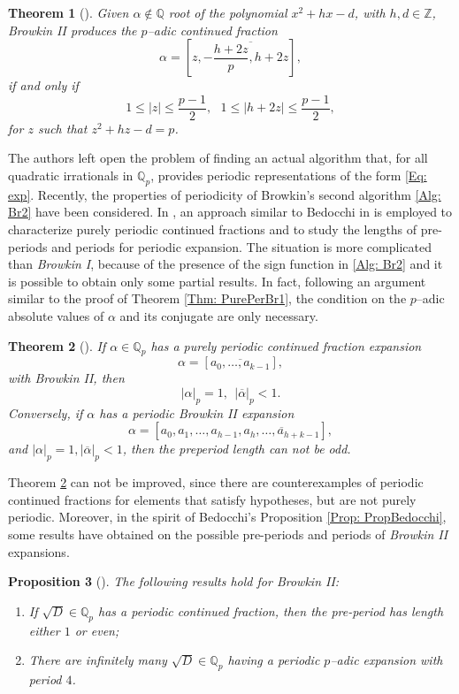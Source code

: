 \documentclass[12pt, reqno]{amsart}
\theoremstyle{plain}
\newtheorem{Theorem}{Theorem}
\newtheorem{Proposition}[Theorem]{Proposition}
\theoremstyle{definition}
\begin{document}
\begin{Theorem}[\cite{BCMI}]
Given $\alpha\not\in\mathbb{Q}$ root of the polynomial $x^2+hx-d$, with $h,d\in\mathbb{Z}$, \textit{Browkin II} produces the $p$--adic continued fraction
\begin{equation}
\alpha=\left[z,-\overline{\frac{h+2z}{p},h+2z}  \right],
\end{equation}
if and only if
\[1\leq|z|\leq\frac{p-1}{2}, \ \ \ 1\leq|h+2z|\leq\frac{p-1}{2},\]
for $z$ such that $z^2+hz-d=p$.
\end{Theorem}

The authors left open the problem of finding an actual algorithm that, for all quadratic irrationals in $\mathbb{Q}_p$, provides periodic representations of the form \eqref{Eq: exp}. Recently, the properties of periodicity of Browkin's second algorithm \eqref{Alg: Br2} have been considered. In \cite{MRSI}, an approach similar to Bedocchi in \cite{BEI,BEII,BEIII,BEIV} is employed to characterize purely periodic continued fractions and to study the lengths of pre-periods and periods for periodic expansion. The situation is more complicated than \textit{Browkin I}, because of the presence of the sign function in \eqref{Alg: Br2} and it is possible to obtain only some partial results. In fact, following an argument similar to the proof of Theorem \ref{Thm: PurePerBr1}, the condition on the $p$--adic absolute values of $\alpha$ and its conjugate are only necessary.

\begin{Theorem}[\cite{BEI}]\label{Thm: Bedo1}
If $\alpha\in\mathbb{Q}_p$ has a purely periodic continued fraction expansion
\[\alpha=[\overline{a_0,\ldots,a_{k-1}}],\]
with \textit{Browkin II}, then
\[ |\alpha|_p=1, \ \ |\overline{\alpha}|_p<1.\]
Conversely, if $\alpha$ has a periodic \textit{Browkin II} expansion
\[\alpha=[a_0,a_1,\ldots,a_{h-1},\overline{a_h,\ldots,a_{h+k-1}}],\]
and $|\alpha|_p=1,|\overline{\alpha}|_p<1$, then the preperiod length can not be odd.
\end{Theorem}
Theorem \ref{Thm: Bedo1} can not be improved, since there are counterexamples of periodic continued fractions for elements that satisfy hypotheses, but are not purely periodic. Moreover, in the spirit of Bedocchi's Proposition \ref{Prop: PropBedocchi}, some results have obtained on the possible pre-periods and periods of \textit{Browkin II} expansions.

\begin{Proposition}[\cite{MRSI}] The following results hold for \textit{Browkin II}:
\begin{enumerate}
\item[i)] If $\sqrt{D}\in\mathbb{Q}_p$ has a periodic continued fraction, then the pre-period has length either $1$ or even;
\item[ii)] There are infinitely many $\sqrt{D} \in \mathbb{Q}_p$ having a periodic $p$--adic expansion with period $4$.
\end{enumerate}
\end{Proposition}
\end{document}
